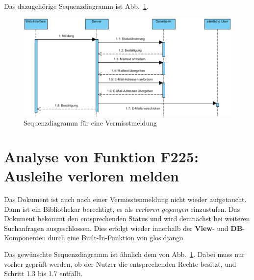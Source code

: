 Das dazugehörige Sequenzdiagramm ist Abb.\ \ref{fig:224}.
\begin{figure}
\begin{center}
\includegraphics[width=0.8\linewidth]{bilder/Seq-Vermisst.pdf}
\caption{Sequenzdiagramm für eine Vermisstmeldung}
\label{fig:224}
\end{center}
\end{figure}

\section{Analyse von Funktion F225: Ausleihe verloren melden}
\label{f:225}
Das Dokument ist auch nach einer Vermisstenmeldung nicht wieder aufgetaucht. Dann ist ein Bibliothekar berechtigt, es als \emph{verloren gegangen} einzustufen. Das Dokument bekommt den entsprechenden Status und wird demnächst bei weiteren Suchanfragen ausgeschlossen. Dies erfolgt wieder innerhalb der \textbf{View}- und \textbf{DB}-Komponenten durch eine Built-In-Funktion von \gls{glos:django}.


Das gewünschte Sequenzdiagramm ist ähnlich dem von Abb.\ \ref{fig:224}. Dabei muss nur vorher geprüft werden, ob der Nutzer die entsprechenden Rechte besitzt, und Schritt 1.3 bis 1.7 entfällt.


